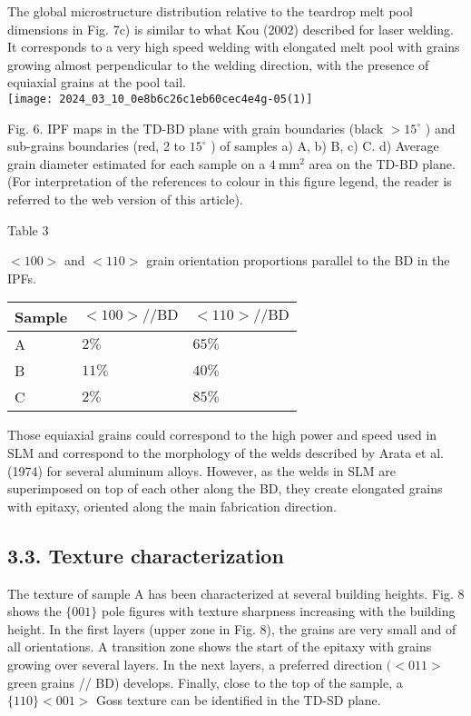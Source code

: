 \documentclass[10pt]{article}
\begin{document}
The global microstructure distribution relative to the teardrop melt pool dimensions in Fig. 7c) is similar to what Kou (2002) described for laser welding. It corresponds to a very high speed welding with elongated melt pool with grains growing almost perpendicular to the welding direction, with the presence of equiaxial grains at the pool tail.\\
\texttt{[image: 2024\_03\_10\_0e8b6c26c1eb60cec4e4g-05(1)]}

Fig. 6. IPF maps in the TD-BD plane with grain boundaries (black $>15^{\circ}$ ) and sub-grains boundaries (red, 2 to $15^{\circ}$ ) of samples a) A, b) B, c) C. d) Average grain diameter estimated for each sample on a $4 \mathrm{~mm}^{2}$ area on the TD-BD plane. (For interpretation of the references to colour in this figure legend, the reader is referred to the web version of this article).

Table 3

$<100>$ and $<110>$ grain orientation proportions parallel to the BD in the IPFs.

\begin{center}
\begin{tabular}{lll}
\hline
Sample & $<100>/ / \mathrm{BD}$ & $<110>/ / \mathrm{BD}$ \\
\hline
A & $2 \%$ & $65 \%$ \\
B & $11 \%$ & $40 \%$ \\
C & $2 \%$ & $85 \%$ \\
\hline
\end{tabular}
\end{center}

Those equiaxial grains could correspond to the high power and speed used in SLM and correspond to the morphology of the welds described by Arata et al.(1974) for several aluminum alloys. However, as the welds in SLM are superimposed on top of each other along the BD, they create elongated grains with epitaxy, oriented along the main fabrication direction.

\subsection*{3.3. Texture characterization}
The texture of sample A has been characterized at several building heights. Fig. 8 shows the $\{001\}$ pole figures with texture sharpness increasing with the building height. In the first layers (upper zone in Fig. 8), the grains are very small and of all orientations. A transition zone shows the start of the epitaxy with grains growing over several layers. In the next layers, a preferred direction $(<011>$ green grains // BD) develops. Finally, close to the top of the sample, a $\{110\}<001>$ Goss texture can be identified in the TD-SD plane.
\end{document}

